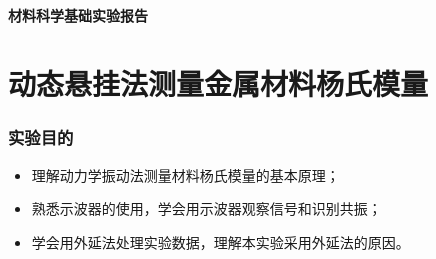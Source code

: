 \documentclass[a4paper,utf8]{article}
\begin{document}
\begin{center}
    {\mbox{}\\[7em]\bfseries\songti%
    材料科学基础实验报告}\\[34mm]
    \pointingbox
\end{center}
\newpage
\part{动态悬挂法测量金属材料杨氏模量}
\section{实验目的}
    \begin{itemize}
        \item 理解动力学振动法测量材料杨氏模量的基本原理；
        \item 熟悉示波器的使用，学会用示波器观察信号和识别共振； 
        \item 学会用外延法处理实验数据，理解本实验采用外延法的原因。
    \end{itemize}
\end{document}
